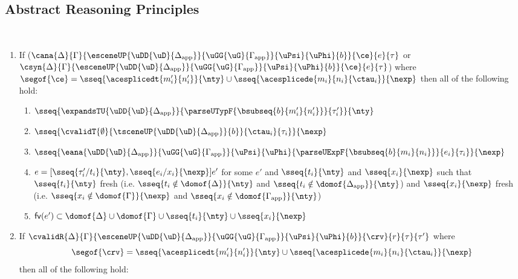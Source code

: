 \subsection{Abstract Reasoning Principles}
\begin{lemma} 
\label{thm:proto-expression-expansion-decomposition-B} ~
\begin{enumerate}
\item If ($\cana
  {\Delta}{\Gamma}
  {\esceneUP
    {\uDD{\uD}{\Delta_\text{app}}}
    {\uGG{\uG}{\Gamma_\text{app}}}
    {\uPsi}{\uPhi}{b}
  }{\ce}{e}{\tau}$ or $\csyn
  {\Delta}{\Gamma}
  {\esceneUP
    {\uDD{\uD}{\Delta_\text{app}}}
    {\uGG{\uG}{\Gamma_\text{app}}}
    {\uPsi}{\uPhi}{b}
  }{\ce}{e}{\tau}$) where $\segof{\ce} = \sseq{\acesplicedt{m'_i}{n'_i}}{\nty} \cup \sseq{\acesplicede{m_i}{n_i}{\ctau_i}}{\nexp}$ then all of the following hold:
  \begin{enumerate}
    \item $\sseq{
          \expandsTU{\uDD{\uD}{\Delta_\text{app}}}
          {
            \parseUTypF{\bsubseq{b}{m'_i}{n'_i}}
          }{\tau'_i}
        }{\nty}$
    \item $\sseq{
      \cvalidT{\emptyset}{
        \tsceneUP
          {\uDD
            {\uD}{\Delta_\text{app}}
          }{b}
      }{
        \ctau_i
      }{\tau_i}
    }{\nexp}$
    \item $\sseq{
      \eana
        {\uDD{\uD}{\Delta_\text{app}}}
        {\uGG{\uG}{\Gamma_\text{app}}}
        {\uPsi}
        {\uPhi}
        {\parseUExpF{\bsubseq{b}{m_i}{n_i}}}
        {e_i}
        {\tau_i}
    }{\nexp}$
    \item $e = [\sseq{\tau'_i/t_i}{\nty}, \sseq{e_i/x_i}{\nexp}]e'$ for some $e'$ and $\sseq{t_i}{\nty}$ and $\sseq{x_i}{\nexp}$ such that $\sseq{t_i}{\nty}$ fresh (i.e.  $\sseq{t_i \notin \domof{\Delta}}{\nty}$ and $\sseq{t_i \notin \domof{\Delta_\text{app}}}{\nty}$) and $\sseq{x_i}{\nexp}$ fresh (i.e.  $\sseq{x_i \notin \domof{\Gamma}}{\nexp}$ and $\sseq{x_i \notin \domof{\Gamma_\text{app}}}{\nty}$)
    \item $\mathsf{fv}(e') \subset \domof{\Delta} \cup \domof{\Gamma} \cup \sseq{t_i}{\nty} \cup \sseq{x_i}{\nexp}$
  \end{enumerate}
\item If $\cvalidR{\Delta}{\Gamma}{\esceneUP{\uDD{\uD}{\Delta_\text{app}}}{\uGG{\uG}{\Gamma_\text{app}}}{\uPsi}{\uPhi}{b}}{\crv}{r}{\tau}{\tau'}$ where \[\segof{\crv} = \sseq{\acesplicedt{m'_i}{n'_i}}{\nty} \cup \sseq{\acesplicede{m_i}{n_i}{\ctau_i}}{\nexp}\] then all of the following hold:

\end{enumerate}
\end{lemma}
